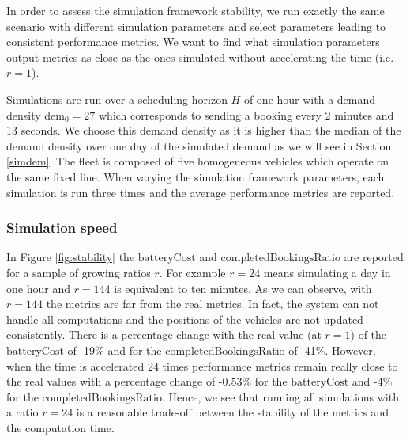 \documentclass[12pt,a4paper]{article}
\begin{document}
In order to assess the simulation framework stability, we run exactly the same scenario with different simulation parameters and select parameters leading to consistent performance metrics. We want to find what simulation parameters output metrics as close as the ones simulated without accelerating the time (i.e. $r=1$).

Simulations are run over a scheduling horizon $H$ of one hour with a demand density $\text{dem}_{0} = 27$ which corresponds to sending a booking every 2 minutes and 13 seconds. We choose this demand density as it is higher than the median of the demand density over one day of the simulated demand as we will see in Section \ref{simdem}. The fleet is composed of five homogeneous vehicles which operate on the same fixed line. When varying the simulation framework parameters, each simulation is run three times and the average performance metrics are reported. 

\subsubsection{Simulation speed} In Figure \ref{fig:stability} the $\text{batteryCost}$ and $\text{completedBookingsRatio}$ are reported for a sample of growing ratios $r$. For example $r = 24$ means simulating a day in one hour and $r=144$ is equivalent to ten minutes. As we can observe, with $r = 144$ the metrics are far from the real metrics. In fact, the system can not handle all computations and the positions of the vehicles are not updated consistently. There is a percentage change with the real value (at $r=1$) of the $\text{batteryCost}$ of -19\% and for the $\text{completedBookingsRatio}$ of -41\%. However, when the time is accelerated 24 times performance metrics remain really close to the real values with a percentage change of -0.53\% for the $\text{batteryCost}$ and -4\% for the $\text{completedBookingsRatio}$. Hence, we see that running all simulations with a ratio $r=24$ is a reasonable trade-off between the stability of the metrics and the computation time.
\end{document}
